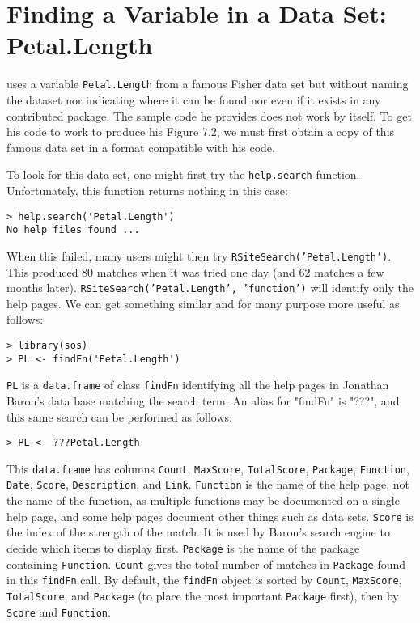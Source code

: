\section*{Finding a Variable in a Data Set:  Petal.Length}

\cite[pp. 282-283]{JC09} uses a variable {\tt Petal.Length} from a
famous Fisher data set but without naming the dataset nor indicating
where it can be found nor even if it exists in any contributed \R{}
package.  The sample code he provides does not work by itself.  To get
his code to  work to produce his Figure 7.2, we must first obtain a
copy of this famous data set in a format compatible with his code.

To look for this data set, one might first try
the {\tt help.search} function.  Unfortunately, this function
returns nothing in this case:
\begin{verbatim}
> help.search('Petal.Length')
No help files found ...
\end{verbatim}
When this failed, many users might then try
{\tt RSiteSearch('Petal.Length')}.  This produced 80 matches
when it was tried one day (and 62 matches a few months later).
{\tt RSiteSearch('Petal.Length', 'function')} will identify
only the help pages.  We can get something similar and for
many purpose more useful as follows:
\begin{verbatim}
> library(sos)
> PL <- findFn('Petal.Length')
\end{verbatim}
{\tt PL} is a {\tt data.frame} of class {\tt findFn} identifying
all the help pages in Jonathan Baron's data base matching the
search term.  An alias for "findFn" is "???", and this same
search can be performed as follows:
\begin{verbatim}
> PL <- ???Petal.Length
\end{verbatim}
This {\tt data.frame} has columns {\tt Count},
{\tt MaxScore}, {\tt TotalScore}, {\tt Package}, {\tt Function},
{\tt Date}, {\tt Score}, {\tt Description}, and {\tt Link}.
{\tt Function} is the name of the help page, not the name of the
function, as multiple functions may be documented on a single
help page, and some help pages document other things such as data
sets.  {\tt Score} is the index of the strength of the match.  It is used
by Baron's search engine to decide which items to display first.
{\tt Package} is the name of the package containing {\tt Function}.
{\tt Count} gives the total number of matches in {\tt Package} found in this
{\tt findFn} call.  By default, the {\tt findFn} object is sorted by {\tt Count}, {\tt MaxScore}, {\tt TotalScore}, 
and {\tt Package} (to place the most important {\tt Package}
first), then by {\tt Score} and {\tt Function}.  

